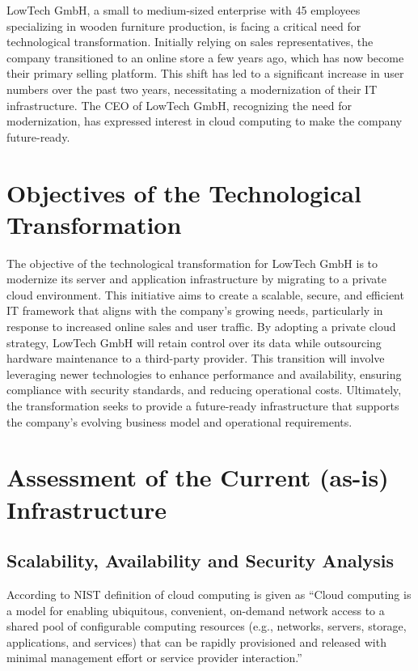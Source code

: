 \documentclass{llncs}
\begin{document}
LowTech GmbH, a small to medium-sized enterprise with 45 employees specializing in wooden furniture production, is facing a critical need for technological transformation. 
Initially relying on sales representatives, the company transitioned to an online store a few years ago, which has now become their primary selling platform. 
This shift has led to a significant increase in user numbers over the past two years, necessitating a modernization of their IT infrastructure. 
The CEO of LowTech GmbH, recognizing the need for modernization, has expressed interest in cloud computing to make the company future-ready.

\section{Objectives of the Technological Transformation}

The objective of the technological transformation for LowTech GmbH is to modernize its server and application infrastructure by migrating to a private cloud environment. 
This initiative aims to create a scalable, secure, and efficient IT framework that aligns with the company's growing needs, particularly in response to increased online sales and user traffic. 
By adopting a private cloud strategy, LowTech GmbH will retain control over its data while outsourcing hardware maintenance to a third-party provider. 
This transition will involve leveraging newer technologies to enhance performance and availability, ensuring compliance with security standards, and reducing operational costs. 
Ultimately, the transformation seeks to provide a future-ready infrastructure that supports the company's evolving business model and operational requirements.

\section{Assessment of the Current (as-is) Infrastructure}

\subsection{Scalability, Availability and Security Analysis}
According to NIST definition of cloud computing is given as ``Cloud computing is a model for enabling ubiquitous, convenient, on-demand network access to a shared
pool of configurable computing resources (e.g., networks, servers, storage, applications, and services) that
can be rapidly provisioned and released with minimal management effort or service provider interaction.'' \cite{mell2011nist}
\end{document}
